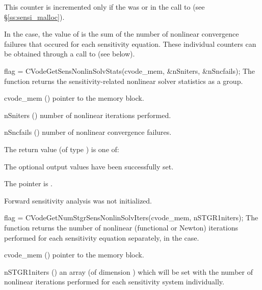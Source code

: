 {
  This counter is incremented only if the  was  or 
   in the call to  (see \S\ref{ss:sensi_malloc}).
  
  In the  case, the value of  is the sum of 
  the number of nonlinear convergence failures that occured for each sensitivity equation.
  These individual counters can be obtained through a call to
   (see below).
}
{
  flag = CVodeGetSensNonlinSolvStats(cvode\_mem, \&nSniters, \&nSncfails);
}
{
  The function  returns the sensitivity-related
  nonlinear solver statistics as a group.
}
{
  \begin{args}
  \item[cvode\_mem] ()
    pointer to the {\cvodes} memory block.
  \item[nSniters] ()
    number of nonlinear iterations performed.
  \item[nSncfails] ()
    number of nonlinear convergence failures.
  \end{args}
}
{
  The return value  (of type ) is one of:
  \begin{args}
  \item[\Id{CV\_SUCCESS}] 
    The optional output values have been successfully set.
  \item[\Id{CV\_MEM\_NULL}]
    The  pointer is .
  \item[\Id{CV\_NO\_SENS}]
    Forward sensitivity analysis was not initialized.
  \end{args}
}
{}
{
  flag = CVodeGetNumStgrSensNonlinSolvIters(cvode\_mem, nSTGR1niters);
}
{
  The function  returns the
  number of nonlinear (functional or Newton) iterations performed for 
  each sensitivity equation separately, in the  case.
}
{
  \begin{args}
  \item[cvode\_mem] ()
    pointer to the {\cvodes} memory block.
  \item[nSTGR1niters] ()
    an array (of dimension ) which will be set with the number of 
    nonlinear iterations performed for each sensitivity system individually.
  \end{args}
}
